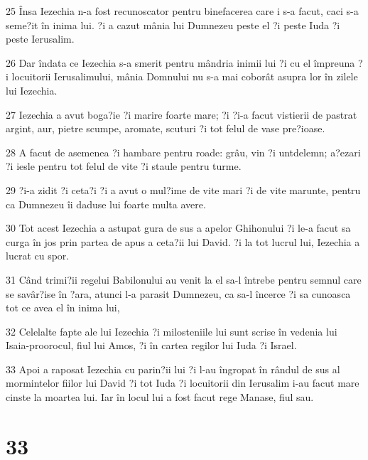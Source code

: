 \par 25 Însa Iezechia n-a fost recunoscator pentru binefacerea care i s-a facut, caci s-a seme?it în inima lui. ?i a cazut mânia lui Dumnezeu peste el ?i peste Iuda ?i peste Ierusalim.
\par 26 Dar îndata ce Iezechia s-a smerit pentru mândria inimii lui ?i cu el împreuna ?i locuitorii Ierusalimului, mânia Domnului nu s-a mai coborât asupra lor în zilele lui Iezechia.
\par 27 Iezechia a avut boga?ie ?i marire foarte mare; ?i ?i-a facut vistierii de pastrat argint, aur, pietre scumpe, aromate, scuturi ?i tot felul de vase pre?ioase.
\par 28 A facut de asemenea ?i hambare pentru roade: grâu, vin ?i untdelemn; a?ezari ?i iesle pentru tot felul de vite ?i staule pentru turme.
\par 29 ?i-a zidit ?i ceta?i ?i a avut o mul?ime de vite mari ?i de vite marunte, pentru ca Dumnezeu îi daduse lui foarte multa avere.
\par 30 Tot acest Iezechia a astupat gura de sus a apelor Ghihonului ?i le-a facut sa curga în jos prin partea de apus a ceta?ii lui David. ?i la tot lucrul lui, Iezechia a lucrat cu spor.
\par 31 Când trimi?ii regelui Babilonului au venit la el sa-l întrebe pentru semnul care se savâr?ise în ?ara, atunci l-a parasit Dumnezeu, ca sa-l încerce ?i sa cunoasca tot ce avea el în inima lui,
\par 32 Celelalte fapte ale lui Iezechia ?i milosteniile lui sunt scrise în vedenia lui Isaia-proorocul, fiul lui Amos, ?i în cartea regilor lui Iuda ?i Israel.
\par 33 Apoi a raposat Iezechia cu parin?ii lui ?i l-au îngropat în rândul de sus al mormintelor fiilor lui David ?i tot Iuda ?i locuitorii din Ierusalim i-au facut mare cinste la moartea lui. Iar în locul lui a fost facut rege Manase, fiul sau.

\chapter{33}

